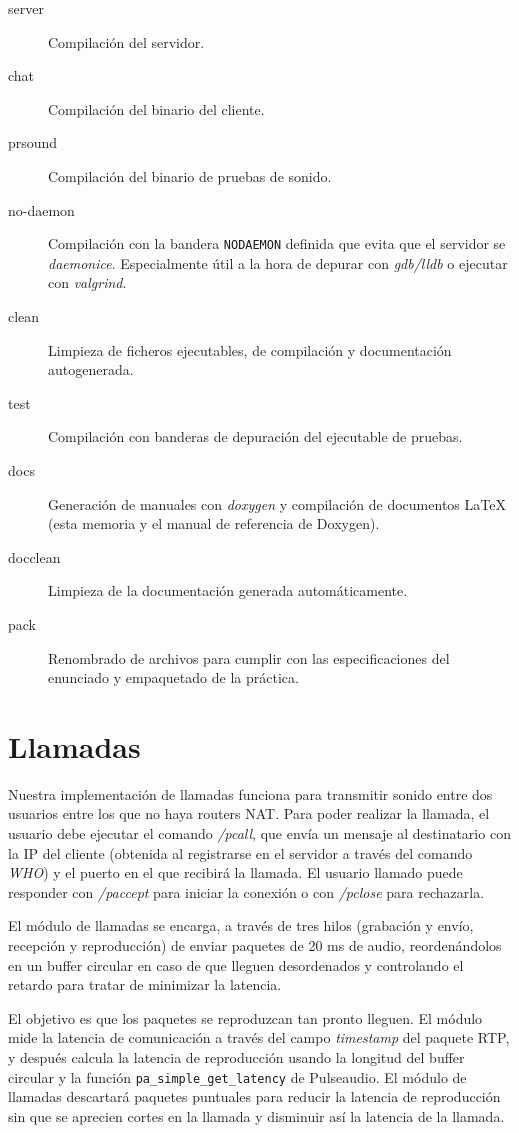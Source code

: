 \documentclass{article}
\begin{document}
\begin{description}
\item[server] Compilación del servidor.
\item[chat]  Compilación del binario del cliente.
\item[prsound] Compilación del binario de pruebas de sonido.
\item[no-daemon] Compilación con la bandera \texttt{NODAEMON} definida que evita que el servidor se \textit{daemonice}. Especialmente útil a la hora de depurar con \textit{gdb/lldb} o ejecutar con \textit{valgrind}.
\item[clean] Limpieza de ficheros ejecutables, de compilación y documentación autogenerada.
\item[test] Compilación con banderas de depuración del ejecutable de pruebas.
\item[docs] Generación de manuales con \textit{doxygen} y compilación de documentos LaTeX (esta memoria y el manual de referencia de Doxygen). 
\item[docclean] Limpieza de la documentación generada automáticamente.
\item[pack] Renombrado de archivos para cumplir con las especificaciones del enunciado y empaquetado de la práctica.
\end{description}

\section{Llamadas}

Nuestra implementación de llamadas funciona para transmitir sonido entre dos usuarios entre los que no haya routers NAT. Para poder realizar la llamada, el usuario debe ejecutar el comando \textit{/pcall}, que envía un mensaje al destinatario con la IP del cliente (obtenida al registrarse en el servidor a través del comando \textit{WHO}) y el puerto en el que recibirá la llamada. El usuario llamado puede responder con \textit{/paccept} para iniciar la conexión o con \textit{/pclose} para rechazarla.

El módulo de llamadas se encarga, a través de tres hilos (grabación y envío, recepción y reproducción) de enviar paquetes de 20 ms de audio, reordenándolos en un buffer circular en caso de que lleguen desordenados y controlando el retardo para tratar de minimizar la latencia. 

El objetivo es que los paquetes se reproduzcan tan pronto lleguen. El módulo mide la latencia de comunicación a través del campo \textit{timestamp} del paquete RTP, y después calcula la latencia de reproducción usando la longitud del buffer circular y la función \texttt{pa\_simple\_get\_latency} de Pulseaudio. El módulo de llamadas descartará paquetes puntuales para reducir la latencia de reproducción sin que se aprecien cortes en la llamada y disminuir así la latencia de la llamada.
\end{document}
